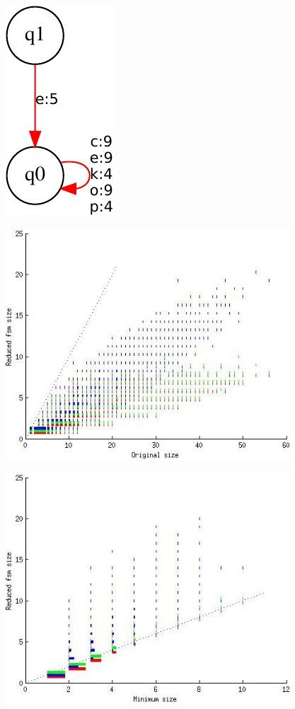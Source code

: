\documentclass{beamer}
\begin{document}
\begin{frame}
\begin{figure}
{\includegraphics[scale=0.3, angle=20]{exact.pdf}
}
\end{figure}
\end{frame}

\begin{frame}
\begin{figure}
\centering
\includegraphics[height=3.4in]{poiss_orig.jpg}
\end{figure}
\end{frame}

\begin{frame}
\begin{figure}
\centering
\includegraphics[height=3.4in]{poiss_exact.jpg}
\end{figure}
\end{frame}
\end{document}
